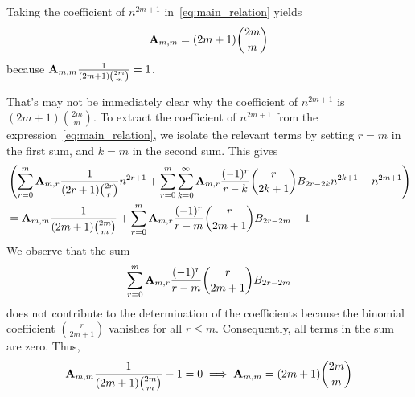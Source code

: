 Taking the coefficient of $n^{2m+1}$ in~\eqref{eq:main_relation} yields
\begin{align*}
    {\mathbf{A}} \sb{m,m} = (2m+1)\binom{2m}{m}
\end{align*}
because ${\mathbf{A}} \sb{m,m} \frac{1}{(2m+1) \binom{2m}{m}} = 1$.

That's may not be immediately clear why the coefficient of $n^{2m+1}$ is $(2m+1)\binom{2m}{m}$.
To extract the coefficient of $n^{2m+1}$ from the expression~\eqref{eq:main_relation},
we isolate the relevant terms by setting $r = m$ in the first sum,
and $k = m$ in the second sum.
This gives
\begin{align*}
[n^{2m+1}]
    &\left(
         \sum_{r=0}^{m} \coeffA{m}{r} \frac{1}{(2r+1) \binom{2r}{r}} n^{2r+1}
         + \sum_{r=0}^{m} \sum_{k=0}^{\infty} \coeffA{m}{r} \frac{(-1)^r}{r-k} \binom{r}{2k+1} \bernoulli{2r - 2k} n^{2k+1}
         - n^{2m+1}
    \right) \\
    &= \coeffA{m}{m} \frac{1}{(2m+1) \binom{2m}{m}}
    + \sum_{r=0}^{m} \coeffA{m}{r} \frac{(-1)^r}{r - m} \binom{r}{2m+1} \bernoulli{2r - 2m}
    - 1
\end{align*}
We observe that the sum
\begin{align*}
    \sum_{r=0}^{m} {\mathbf{A}} \sb{m,r} \frac{(-1)^r}{r - m} \binom{r}{2m+1} {B}\sb{2r - 2m}
\end{align*}
does not contribute to the determination of the coefficients because the binomial coefficient
$\binom{r}{2m+1}$ vanishes for all $r \leq m$.
Consequently, all terms in the sum are zero.
Thus,
\begin{align*}
    {\mathbf{A}} \sb{m,m} \frac{1}{(2m+1) \binom{2m}{m}}  - 1 = 0 \implies {\mathbf{A}} \sb{m,m} = (2m+1) \binom{2m}{m}
\end{align*}

